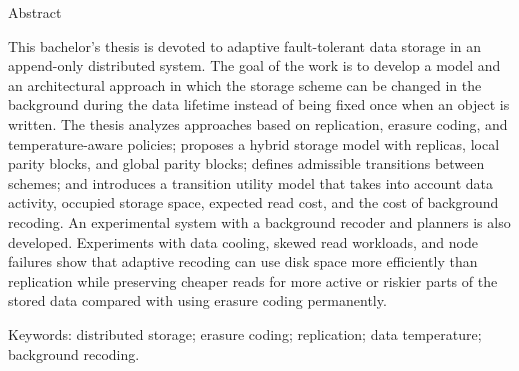 Abstract

This bachelor’s thesis is devoted to adaptive fault-tolerant data storage in an append-only distributed system. The goal of the work is to develop a model and an architectural approach in which the storage scheme can be changed in the background during the data lifetime instead of being fixed once when an object is written. The thesis analyzes approaches based on replication, erasure coding, and temperature-aware policies; proposes a hybrid storage model with replicas, local parity blocks, and global parity blocks; defines admissible transitions between schemes; and introduces a transition utility model that takes into account data activity, occupied storage space, expected read cost, and the cost of background recoding. An experimental system with a background recoder and planners is also developed. Experiments with data cooling, skewed read workloads, and node failures show that adaptive recoding can use disk space more efficiently than replication while preserving cheaper reads for more active or riskier parts of the stored data compared with using erasure coding permanently.

Keywords: distributed storage; erasure coding; replication; data temperature; background recoding.
